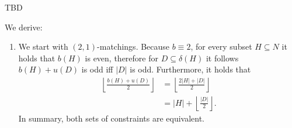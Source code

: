 \begin{aufgabe}
    TBD
\end{aufgabe}
\begin{aufgabe}
    We derive:
    \begin{enumerate}[label=(\alph*)]
        \item We start with $(2,1)$-matchings.
              Because $b \equiv 2$, for every subset $H \subseteq N$ it holds
              that $b(H)$ is even, therefore for $D \subseteq \delta(H)$ it follows
              $b(H)+u(D)$ is odd iff $|D|$ is odd. Furthermore, it holds that
              \begin{align*}
                  \left\lfloor \frac{b(H) + u(D)}{2}\right\rfloor & = \left\lfloor \frac{2 |H| + |D|}{2}\right\rfloor \\
                                                                  & = |H| + \left\lfloor \frac{|D|}{2}\right\rfloor.
              \end{align*}
              In summary, both sets of constraints are equivalent.


\end{enumerate}
\end{aufgabe}

